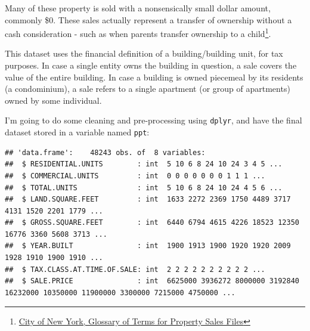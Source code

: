 \documentclass[]{article}
\newenvironment{Shaded}{\begin{snugshade}}{\end{snugshade}}
\newcommand{\DataTypeTok}[1]{\textcolor[rgb]{0.13,0.29,0.53}{#1}}
\newcommand{\KeywordTok}[1]{\textcolor[rgb]{0.13,0.29,0.53}{\textbf{#1}}}
\newcommand{\NormalTok}[1]{#1}
\newcommand{\OperatorTok}[1]{\textcolor[rgb]{0.81,0.36,0.00}{\textbf{#1}}}
\newcommand{\StringTok}[1]{\textcolor[rgb]{0.31,0.60,0.02}{#1}}
\begin{document}
Many of these property is sold with a nonsensically small dollar amount,
commonly \$0. These sales actually represent a transfer of ownership
without a cash consideration - such as when parents transfer ownership
to a child\footnote{\href{http://www1.nyc.gov/assets/finance/downloads/pdf/07pdf/glossary_rsf071607.pdf}{City
  of New York, Glossary of Terms for Property Sales Files}}.

This dataset uses the financial definition of a building/building unit,
for tax purposes. In case a single entity owns the building in question,
a sale covers the value of the entire building. In case a building is
owned piecemeal by its residents (a condominium), a sale refers to a
single apartment (or group of apartments) owned by some individual.

I'm going to do some cleaning and pre-processing using \texttt{dplyr},
and have the final dataset stored in a variable named \texttt{ppt}:

\begin{Shaded}
\end{Shaded}

\begin{verbatim}
## 'data.frame':    48243 obs. of  8 variables:
##  $ RESIDENTIAL.UNITS        : int  5 10 6 8 24 10 24 3 4 5 ...
##  $ COMMERCIAL.UNITS         : int  0 0 0 0 0 0 0 1 1 1 ...
##  $ TOTAL.UNITS              : int  5 10 6 8 24 10 24 4 5 6 ...
##  $ LAND.SQUARE.FEET         : int  1633 2272 2369 1750 4489 3717 4131 1520 2201 1779 ...
##  $ GROSS.SQUARE.FEET        : int  6440 6794 4615 4226 18523 12350 16776 3360 5608 3713 ...
##  $ YEAR.BUILT               : int  1900 1913 1900 1920 1920 2009 1928 1910 1900 1910 ...
##  $ TAX.CLASS.AT.TIME.OF.SALE: int  2 2 2 2 2 2 2 2 2 2 ...
##  $ SALE.PRICE               : int  6625000 3936272 8000000 3192840 16232000 10350000 11900000 3300000 7215000 4750000 ...
\end{verbatim}
\end{document}
